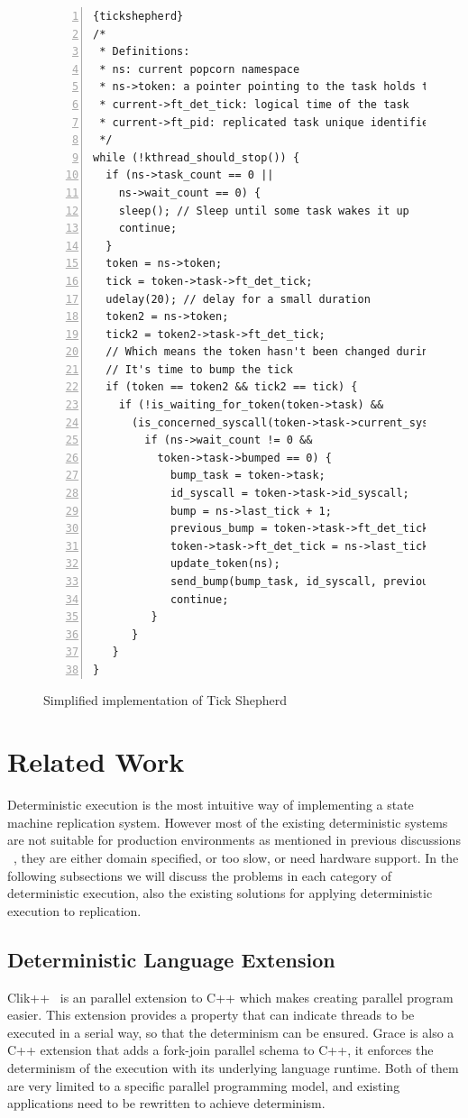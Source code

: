 \begin{figure}
\begin{lstlisting}[numbers=left, frame=single, basicstyle=\small, breaklines]{tickshepherd}
/*
 * Definitions:
 * ns: current popcorn namespace
 * ns->token: a pointer pointing to the task holds the token
 * current->ft_det_tick: logical time of the task
 * current->ft_pid: replicated task unique identifier
 */
while (!kthread_should_stop()) {
  if (ns->task_count == 0 ||
    ns->wait_count == 0) {
    sleep(); // Sleep until some task wakes it up
    continue;
  }
  token = ns->token;
  tick = token->task->ft_det_tick;
  udelay(20); // delay for a small duration
  token2 = ns->token;
  tick2 = token2->task->ft_det_tick;
  // Which means the token hasn't been changed during the delay,
  // It's time to bump the tick
  if (token == token2 && tick2 == tick) {
    if (!is_waiting_for_token(token->task) &&
      (is_concerned_syscall(token->task->current_syscall)) {
        if (ns->wait_count != 0 &&
          token->task->bumped == 0) {
            bump_task = token->task;
            id_syscall = token->task->id_syscall;
            bump = ns->last_tick + 1;
            previous_bump = token->task->ft_det_tick;
            token->task->ft_det_tick = ns->last_tick + 1;
            update_token(ns);
            send_bump(bump_task, id_syscall, previous_bump, bump);
            continue;
         }
      }
   }
}
\end{lstlisting}
\caption{Simplified implementation of Tick Shepherd}
\label{f:tickbump_code}
\end{figure}

\section{Related Work}
Deterministic execution is the most intuitive way of implementing a state machine replication system. However most of the existing deterministic systems are not suitable for production environments as mentioned in previous discussions ~\cite{bergan2011deterministic}, they are either domain specified, or too slow, or need hardware support. In the following subsections we will discuss the problems in each category of deterministic execution, also the existing solutions for applying deterministic execution to replication.


\subsection{Deterministic Language Extension}
Clik++~\cite{leiserson2010cilk++} is an parallel extension to C++ which makes creating parallel program easier. This extension provides a property that can indicate threads to be executed in a serial way, so that the determinism can be ensured. Grace \cite{berger2009grace} is also a C++ extension that adds a fork-join parallel schema to C++, it enforces the determinism of the execution with its underlying language runtime. Both of them are very limited to a specific parallel programming model, and existing applications need to be rewritten to achieve determinism.

